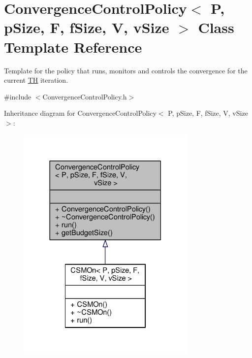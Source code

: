 \hypertarget{classConvergenceControlPolicy}{}\section{Convergence\+Control\+Policy$<$ P, p\+Size, F, f\+Size, V, v\+Size $>$ Class Template Reference}
\label{classConvergenceControlPolicy}


Template for the policy that runs, monitors and controls the convergence for the current \hyperlink{classTH}{TH} iteration.  




{\ttfamily \#include $<$Convergence\+Control\+Policy.\+h$>$}



Inheritance diagram for Convergence\+Control\+Policy$<$ P, p\+Size, F, f\+Size, V, v\+Size $>$\+:\nopagebreak
\begin{figure}[H]
\begin{center}
\leavevmode
\includegraphics[width=249pt]{classConvergenceControlPolicy__inherit__graph}
\end{center}
\end{figure}


